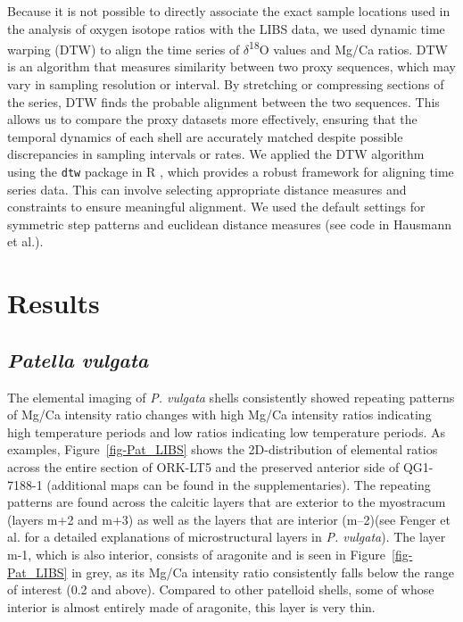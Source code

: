 \documentclass[
  authoryear,
  preprint,
  3p]{elsarticle}
\begin{document}
Because it is not possible to directly associate the exact sample
locations used in the analysis of oxygen isotope ratios with the LIBS
data, we used dynamic time warping (DTW) to align the time series of
\(\delta\)\textsuperscript{18}O values and Mg/Ca ratios. DTW is an
algorithm that measures similarity between two proxy sequences, which
may vary in sampling resolution or interval. By stretching or
compressing sections of the series, DTW finds the probable alignment
between the two sequences. This allows us to compare the proxy datasets
more effectively, ensuring that the temporal dynamics of each shell are
accurately matched despite possible discrepancies in sampling intervals
or rates. We applied the DTW algorithm using the \texttt{dtw} package in
R \citep{Giorgino2009-sj, R_Core_Team2020-mk}, which provides a robust
framework for aligning time series data. This can involve selecting
appropriate distance measures and constraints to ensure meaningful
alignment. We used the default settings for symmetric step patterns and
euclidean distance measures (see code in Hausmann et
al.\citeyearpar{hausmann2024confirmation}).

\section{Results}\label{Results}

\subsection{\texorpdfstring{\emph{Patella
vulgata}}{Patella vulgata}}\label{patella-vulgata}

The elemental imaging of \emph{P. vulgata} shells consistently showed
repeating patterns of Mg/Ca intensity ratio changes with high Mg/Ca
intensity ratios indicating high temperature periods and low ratios
indicating low temperature periods. As examples,
Figure~\ref{fig-Pat_LIBS} shows the 2D-distribution of elemental ratios
across the entire section of ORK-LT5 and the preserved anterior side of
QG1-7188-1 (additional maps can be found in the supplementaries). The
repeating patterns are found across the calcitic layers that are
exterior to the myostracum (layers m+2 and m+3) as well as the layers
that are interior (m--2)(see Fenger et al. \citeyearpar{Fenger2007-gf}
for a detailed explanations of microstructural layers in \emph{P.
vulgata}). The layer m-1, which is also interior, consists of aragonite
and is seen in Figure~\ref{fig-Pat_LIBS} in grey, as its Mg/Ca intensity
ratio consistently falls below the range of interest (0.2 and above).
Compared to other patelloid shells, some of whose interior is almost
entirely made of aragonite, this layer is very thin. \newline
\end{document}
